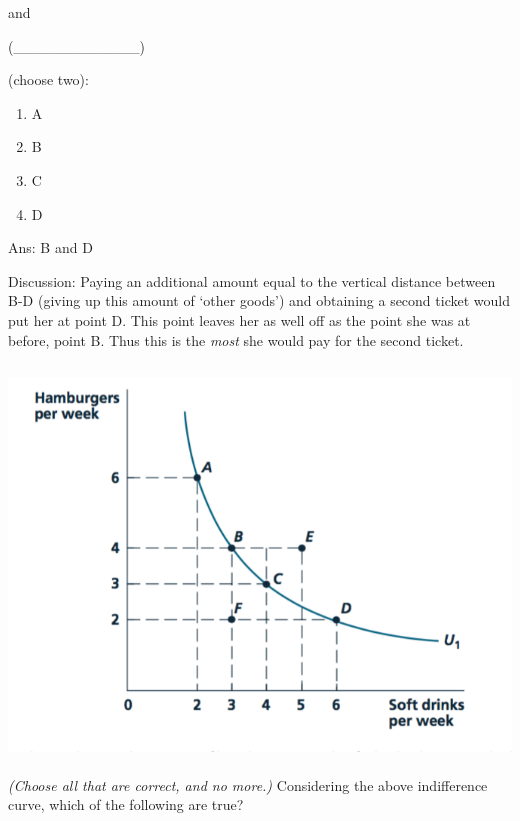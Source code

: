 \documentclass[]{article}
\begin{document}
and

(\_\_\_\_\_\_\_\_\_\_\_\_)

(choose two):

\begin{enumerate}
\def\labelenumi{\Alph{enumi}.}
\item
  A
\item
  B
\item
  C
\item
  D
\end{enumerate}

Ans: B and D

Discussion: Paying an additional amount equal to the vertical distance
between B-D (giving up this amount of `other goods') and obtaining a
second ticket would put her at point D. This point leaves her as well
off as the point she was at before, point B. Thus this is the
\emph{most} she would pay for the second ticket.

\hypertarget{section-5}{%
\subsubsection{}\label{section-5}}

\includegraphics[width=\textwidth,height=4in]{../picsfigs/fig2-2.png}

\emph{(Choose all that are correct, and no more.)} Considering the above
indifference curve, which of the following are true?
\end{document}
